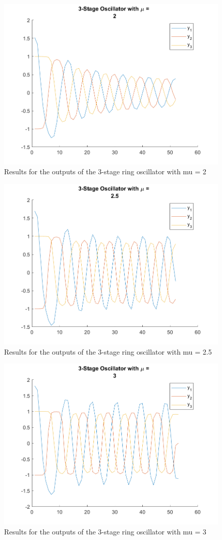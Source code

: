 \documentclass[letter]{article}
\begin{document}
\begin{figure}[p]
	\centering
	\includegraphics[width=0.7\linewidth]{fig/HW6_pblm3_results_mu_2}
	\caption{Results for the outputs of the 3-stage ring oscillator with mu = 2}
	\label{fig:pblm3_mu2}
\end{figure}

\begin{figure}[p]
	\centering
	\includegraphics[width=0.7\linewidth]{fig/HW6_pblm3_results_mu_2.5}
	\caption{Results for the outputs of the 3-stage ring oscillator with mu = 2.5}
	\label{fig:pblm3_mu25}
\end{figure}

\begin{figure}[p]
	\centering
	\includegraphics[width=0.7\linewidth]{fig/HW6_pblm3_results_mu_3}
	\caption{Results for the outputs of the 3-stage ring oscillator with mu = 3}
	\label{fig:pblm3_mu3}
\end{figure}
\end{document}
